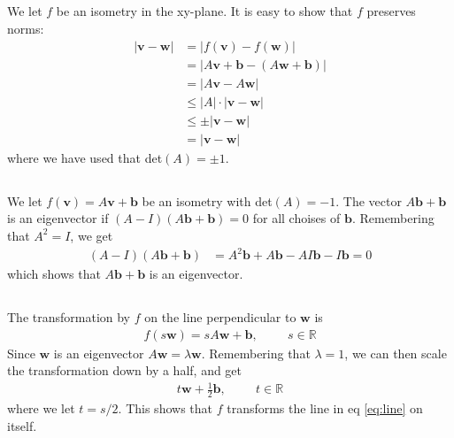 \documentclass[a4paper,10pt,english]{article}
\begin{document}
\subsection{} \label{3a}
We let $f$ be an isometry in the xy-plane. It is easy to show that $f$ preserves norms:
\begin{align*}
    |\bm{v} - \bm{w}| &= |f(\bm{v}) - f(\bm{w})| \\
    &= |A\bm{v} + \bm{b} - (A\bm{w} + \bm{b})| \\
    &= |A\bm{v} - A\bm{w}| \\
    &\leq |A| \cdot |\bm{v} - \bm{w}| \\
    &\leq \pm |\bm{v} - \bm{w}| \\
    &= |\bm{v} - \bm{w}|
\end{align*}
where we have used that det$(A)=\pm 1$.

\subsection{} \label{3b}
We let $f(\bm{v}) = A \bm{v} + \bm{b}$ be an isometry with det$(A)=-1$. The vector $A \bm{b} + \bm{b}$ is an eigenvector if $(A-I)(A \bm{b} + \bm{b}) = 0$ for all choises of $\bm{b}$. Remembering that $A^2 = I$, we get
\begin{align*}
    (A-I)(A \bm{b} + \bm{b}) &= A^2 \bm{b} + A \bm{b} - AI \bm{b} - I \bm{b} = 0
\end{align*}
which shows that $A \bm{b} + \bm{b}$ is an eigenvector.

\subsection{} \label{3c}
The transformation by $f$ on the line perpendicular to $\bm{w}$ is
\begin{align*}
    f(s\bm{w}) = s A \bm{w} + \bm{b}, \hspace{1cm} s \in \mathbb{R}
\end{align*}
Since $\bm{w}$ is an eigenvector $A \bm{w} = \lambda \bm{w}$. Remembering that $\lambda = 1$, we can then scale the transformation down by a half, and get
\begin{align} \label{eq:line}
    t \bm{w} + \frac{1}{2} \bm{b}, \hspace{1cm} t \in \mathbb{R}
\end{align}
where we let $t = s/2$. This shows that $f$ transforms the line in eq \ref{eq:line} on itself.
\end{document}
